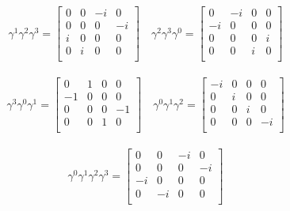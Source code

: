 \documentclass{article}
\begin{document}
\begin{align*}
\gamma^1 \gamma^2 \gamma^3 = \begin{bmatrix}
 0  &  0  &  -i  &  0  \\
 0  &  0  &  0  &  -i  \\
 i  &  0  &  0  &  0  \\
 0  &  i  &  0  &  0  \\
\end{bmatrix} \quad
\gamma^2 \gamma^3 \gamma^0 = \begin{bmatrix}
 0  &  -i  &  0  &  0  \\
 -i  &  0  &  0  &  0  \\
 0  &  0  &  0  &  i  \\
 0  &  0  &  i  &  0  \\
\end{bmatrix}
\end{align*}

\begin{align*}
\gamma^3 \gamma^0 \gamma^1 = \begin{bmatrix}
 0  &  1  &  0  &  0  \\
 -1  &  0  &  0  &  0  \\
 0  &  0  &  0  &  -1  \\
 0  &  0  &  1  &  0  \\
\end{bmatrix} \quad
\gamma^0 \gamma^1 \gamma^2 = \begin{bmatrix}
 -i  &  0  &  0  &  0  \\
 0  &  i  &  0  &  0  \\
 0  &  0  &  i  &  0  \\
 0  &  0  &  0  &  -i  \\
\end{bmatrix}
\end{align*}

\begin{align*}
\gamma^0 \gamma^1 \gamma^2 \gamma^3 = \begin{bmatrix}
 0  &  0  &  -i  &  0  \\
 0  &  0  &  0  &  -i  \\
 -i  &  0  &  0  &  0  \\
 0  &  -i  &  0  &  0  \\
\end{bmatrix}
\end{align*}



%
%
\end{document}
